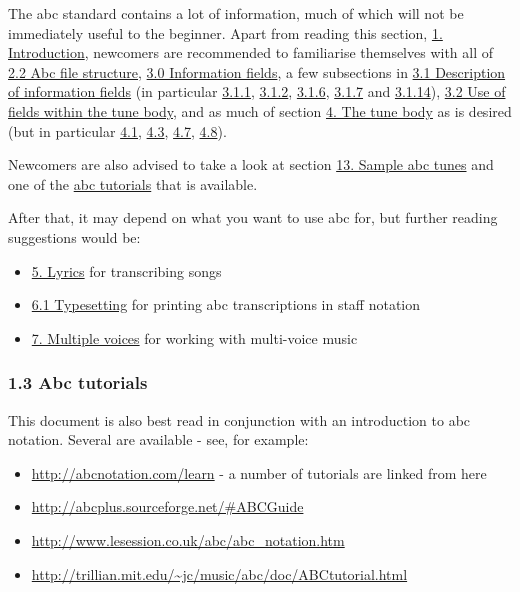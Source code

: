 \documentclass[oneside]{book}
\begin{document}
The abc standard contains a lot of information, much of which will not
be immediately useful to the beginner. Apart from reading this section,
\protect\hyperlink{introduction}{1. Introduction}, newcomers are
recommended to familiarise themselves with all of
\protect\hyperlink{abc_file_structure}{2.2 Abc file structure},
\protect\hyperlink{information_fields}{3.0 Information fields}, a few
subsections in \protect\hyperlink{description_of_information_fields}{3.1
Description of information fields} (in particular
\protect\hyperlink{xreference_number}{3.1.1},
\protect\hyperlink{ttune_title}{3.1.2},
\protect\hyperlink{mmeter}{3.1.6},
\protect\hyperlink{lunit_note_length}{3.1.7} and
\protect\hyperlink{kkey}{3.1.14}),
\protect\hyperlink{use_of_fields_within_the_tune_body}{3.2 Use of fields
within the tune body}, and as much of section
\protect\hyperlink{the_tune_body}{4. The tune body} as is desired (but
in particular \protect\hyperlink{pitch}{4.1},
\protect\hyperlink{note_lengths}{4.3}, \protect\hyperlink{beams}{4.7},
\protect\hyperlink{repeat_bar_symbols}{4.8}).

Newcomers are also advised to take a look at section
\protect\hyperlink{sample_abc_tunes}{13. Sample abc tunes} and one of
the \protect\hyperlink{abc_tutorials}{abc tutorials} that is available.

After that, it may depend on what you want to use abc for, but further
reading suggestions would be:

\begin{itemize}
\item
  \protect\hyperlink{lyrics}{5. Lyrics} for transcribing songs
\item
  \protect\hyperlink{typesetting}{6.1 Typesetting} for printing abc
  transcriptions in staff notation
\item
  \protect\hyperlink{multiple_voices}{7. Multiple voices} for working
  with multi-voice music
\end{itemize}

\hypertarget{abc_tutorials}{\subsubsection{1.3 Abc
tutorials}\label{abc_tutorials}}

This document is also best read in conjunction with an introduction to
abc notation. Several are available - see, for example:

\begin{itemize}
\item
  \url{http://abcnotation.com/learn} - a number of tutorials are linked
  from here
\item
  \url{http://abcplus.sourceforge.net/\#ABCGuide}
\item
  \url{http://www.lesession.co.uk/abc/abc_notation.htm}
\item
  \url{http://trillian.mit.edu/~jc/music/abc/doc/ABCtutorial.html}
\end{itemize}
\end{document}
